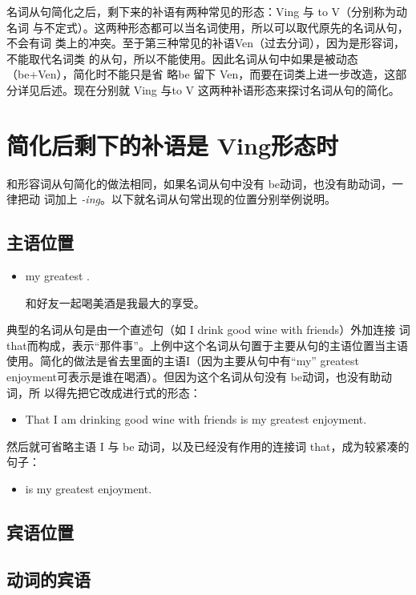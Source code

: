 名词从句简化之后，剩下来的补语有两种常见的形态：Ving 与 to V（分别称为动名词
与不定式）。这两种形态都可以当名词使用，所以可以取代原先的名词从句，不会有词
类上的冲突。至于第三种常见的补语Ven（过去分词），因为是形容词，不能取代名词类
的从句，所以不能使用。因此名词从句中如果是被动态（be+Ven），简化时不能只是省
略be 留下 Ven，而要在词类上进一步改造，这部分详见后述。现在分别就 Ving 与to
V 这两种补语形态来探讨名词从句的简化。

\section{简化后剩下的补语是 Ving形态时}

和形容词从句简化的做法相同，如果名词从句中没有 be动词，也没有助动词，一律把动
词加上 \emph{-ing}。以下就名词从句常出现的位置分别举例说明。

\subsection{主语位置}

\begin{itemize}
\item {}  my greatest .

  和好友一起喝美酒是我最大的享受。
\end{itemize}
典型的名词从句是由一个直述句（如 I drink good wine with friends）外加连接
词 that而构成，表示“那件事”。上例中这个名词从句置于主要从句的主语位置当主语
使用。简化的做法是省去里面的主语I（因为主要从句中有“my” greatest
enjoyment可表示是谁在喝酒）。但因为这个名词从句没有 be动词，也没有助动词，所
以得先把它改成进行式的形态：
\begin{itemize}
\item That I am drinking good wine with friends is my greatest enjoyment.
\end{itemize}
然后就可省略主语 I 与 be 动词，以及已经没有作用的连接词
that，成为较紧凑的句子：
\begin{itemize}
\item {} is my greatest enjoyment.
\end{itemize}

\subsection{宾语位置}

\subsection{动词的宾语}

